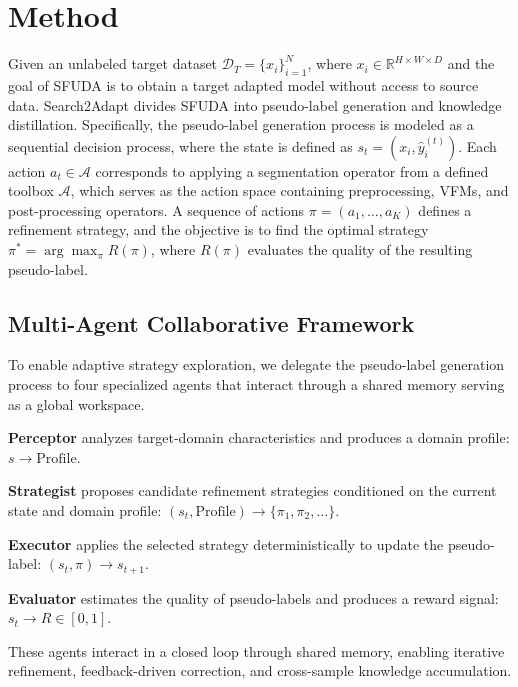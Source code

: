 \documentclass[sigconf, screen]{acmart}
\begin{document}
\section{Method}
\label{sec:method}
Given an unlabeled target dataset $\mathcal{D}_T=\{x_i\}_{i=1}^{N}$, where $x_i\in\mathbb{R}^{H\times W\times D}$ and the goal of SFUDA is to obtain a target adapted model without access to source data. Search2Adapt divides SFUDA into pseudo-label generation and knowledge distillation. Specifically, the pseudo-label generation process is modeled as a sequential decision process, where the state is defined as $s_t=(x_i,\hat{y}_i^{(t)})$. Each action $a_t \in \mathcal{A}$ corresponds to applying a segmentation operator from a defined toolbox $\mathcal{A}$, which serves as the action space containing preprocessing, VFMs, and post-processing operators. A sequence of actions $\pi=(a_1,\dots,a_K)$ defines a refinement strategy, and the objective is to find the optimal strategy $\pi^* = \arg\max_{\pi} R(\pi)$, where $R(\pi)$ evaluates the quality of the resulting pseudo-label.
\subsection{Multi-Agent Collaborative Framework}
To enable adaptive strategy exploration, we delegate the pseudo-label generation process to four specialized agents that interact through a shared memory serving as a global workspace.

\textbf{Perceptor} analyzes target-domain characteristics and produces a domain profile:
$s \rightarrow \text{Profile}$.

\textbf{Strategist} proposes candidate refinement strategies conditioned on the current state and domain profile:
$(s_t,\text{Profile}) \rightarrow \{\pi_1,\pi_2,\dots\}$.

\textbf{Executor} applies the selected strategy deterministically to update the pseudo-label:
$(s_t,\pi) \rightarrow s_{t+1}$.

\textbf{Evaluator} estimates the quality of pseudo-labels and produces a reward signal:
$s_t \rightarrow R \in [0,1]$.

These agents interact in a closed loop through shared memory, enabling iterative refinement, feedback-driven correction, and cross-sample knowledge accumulation.
\end{document}
